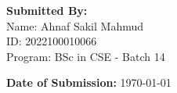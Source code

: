 \documentclass[12pt, a4paper]{article}
\begin{document}
\begin{titlepage}
\begin{center}
            \vspace{1.5cm}                                                                                                                                                 
                                                                                                                                                                           
            \begin{flushleft}                                                                                                                                              
                \textbf{Submitted By:}\\                                                                                                                                   
                Name: Ahnaf Sakil Mahmud\\                                                                                                                                 
                ID: 2022100010066\\                                                                                                                                        
                Program: BSc in CSE - Batch 14\\                                                                                                                           
            \end{flushleft}                                                                                                                                                
                                                                                                                                                                           
            \vfill                                                                                                                                                         
                                                                                                                                                                           
            \textbf{Date of Submission:} \today                                                                                                                            
                                                                                                                                                                           
        \end{center}                                                                                                                                                       
    \end{titlepage}                                                                                                                                                        
                                                                                                                                                                           
\end{document}
